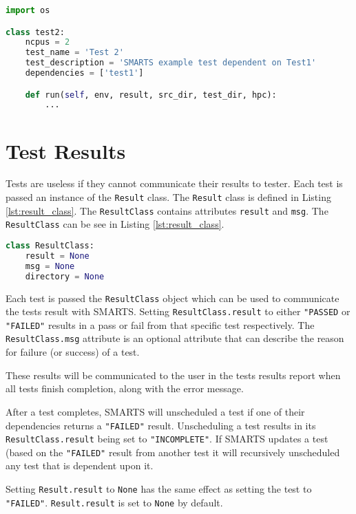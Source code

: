 \begin{lstlisting}[language=Python, 
                   caption={Example Test With Dependencies},
                   label={lst:example_test_with_dep}]
import os

class test2:
    ncpus = 2
    test_name = 'Test 2'
    test_description = 'SMARTS example test dependent on Test1'
    dependencies = ['test1']

    def run(self, env, result, src_dir, test_dir, hpc):
        ...
\end{lstlisting}

\section{Test Results}
\label{sec:results}

Tests are useless if they cannot communicate their results to tester. Each test
is passed an instance of the {\tt Result} class. The {\tt Result} class is
defined in Listing \ref{lst:result_class}. The {\tt ResultClass} contains
attributes {\tt result} and {\tt msg}. The {\tt ResultClass} can be see in
Listing \ref{lst:result_class}.

\begin{lstlisting}[language=Python, 
                   caption={Result class definition},
                   label={lst:result_class}]
class ResultClass:
    result = None
    msg = None
    directory = None
\end{lstlisting}

Each test is passed the {\tt ResultClass} object which can be used to
communicate the tests result with SMARTS. Setting {\tt ResultClass.result} to
either {\tt "PASSED} or {\tt "FAILED"} results in a pass or fail from that
specific test respectively. The {\tt ResultClass.msg} attribute is an optional
attribute that can describe the reason for failure (or success) of a test.

These results will be communicated to the user in the tests results report when
all tests finish completion, along with the error message.

After a test completes, SMARTS will unscheduled a test if one of their
dependencies returns a {\tt "FAILED"} result. Unscheduling a test results in
its {\tt ResultClass.result} being set to {\tt "INCOMPLETE"}. If SMARTS updates
a test (based on the {\tt "FAILED"} result from another test it will
recursively unscheduled any test that is dependent upon it.

Setting {\tt Result.result} to {\tt None} has the same effect as setting the
test to {\tt "FAILED"}. {\tt Result.result} is set to {\tt None} by default.

